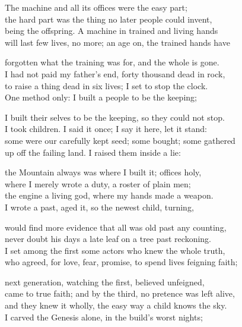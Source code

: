 \begin{founder}
The machine and all its offices were the easy part;\\
the hard part was the thing no later people could invent,\\
being the offspring. A machine in trained and living hands\\
will last few lives, no more; an age on, the trained hands have\\
\medskip

forgotten what the training was for, and the whole is gone.\\
I had not paid my father's end, forty thousand dead in rock,\\
to raise a thing dead in six lives; I set to stop the clock.\\
One method only: I built a people to be the keeping;\\
\medskip

I built their selves to be the keeping, so they could not stop.\\
I took children. I said it once; I say it here, let it stand:\\
some were our carefully kept seed; some bought; some gathered\\
up off the failing land. I raised them inside a lie:\\
\medskip

the Mountain always was where I built it; offices holy,\\
where I merely wrote a duty, a roster of plain men;\\
the engine a living god, where my hands made a weapon.\\
I wrote a past, aged it, so the newest child, turning,\\
\medskip

would find more evidence that all was old past any counting,\\
never doubt his days a late leaf on a tree past reckoning.\\
I set among the first some actors who knew the whole truth,\\
who agreed, for love, fear, promise, to spend lives feigning faith;\\
\medskip

next generation, watching the first, believed unfeigned,\\
came to true faith; and by the third, no pretence was left alive,\\
and they knew it wholly, the easy way a child knows the sky.\\
I carved the Genesis alone, in the build's worst nights;\\
\medskip


\end{founder}

